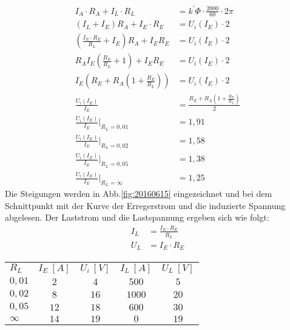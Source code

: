 \begin{solution}
\begin{compactenum}
\begin{align}
I_A \cdot R_A + I_L \cdot R_L &= k^{'} \Phi \cdot \frac{2000}{60} \cdot 2 \pi\\
(I_L + I_E) R_A + I_E \cdot R_E &= U_i(I_E) \cdot 2\\
\left (\frac{I_E \cdot R_E}{R_L} + I_E \right )R_A + I_E R_E &= U_i(I_E)\cdot 2\\
R_A I_E \left ( \frac{R_E}{R_L} + 1 \right ) + I_E R_E &= U_i(I_E)\cdot 2\\
I_E\left(R_E +R_A\left(1 + \frac{R_E}{R_L}\right )\right) &= U_i(I_E)\cdot 2\\
\frac{U_i(I_E)}{I_E} &= \frac{R_E +R_A\left(1 + \frac{R_E}{R_L}\right)}{2}\\
\frac{U_i(I_E)}{I_E}|_{R_L=0,01} &= 1,91\\
\frac{U_i(I_E)}{I_E}|_{R_L=0,02} &= 1,58\\
\frac{U_i(I_E)}{I_E}|_{R_L=0,05} &= 1,38\\
\frac{U_i(I_E)}{I_E}|_{R_L=\infty} &= 1,25
\end{align}
Die Steigungen werden in Abb.\ref{fig:20160615} eingezeichnet und bei dem Schnittpunkt mit der Kurve der Erregerstrom und die induzierte Spannung abgelesen. Der Laststrom und die Lastspannung ergeben sich wie folgt:
\begin{align}
I_L &= \frac{I_E \cdot R_E}{R_L}\\
U_L &= I_E \cdot R_E
\end{align}
\begin{tabular}{lcccc}
$R_L$   & $I_E~[A]$  & $U_i~[V]$ & $I_L~[A]$ & $U_L~[V]$\\
$0,01$  & $2$    & $4$   & $500$ & $5$\\
$0,02$  & $8$    & $16$  & $1000$& $20$\\
$0,05$  & $12$   & $18$  & $600$ & $30$\\
$\infty$& $14$   & $19$  & $0$   & $19$\\
\end{tabular}
\begin{figure}[H]
	\label{fig:20160615lsg25}
	\end{figure}
	\end{compactenum}
\end{solution}